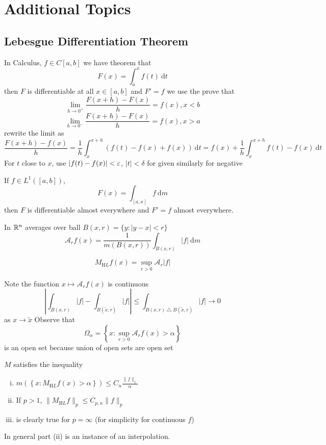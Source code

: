 
\chapter{Additional Topics}
\section{Lebesgue Differentiation Theorem}

In Calculus, $f \in C[a, b]$
we have theorem that 
\[F(x) = \int_a^x f(t) \ \mathrm{d}t\]
then $F$ is differentiable at all $x \in [a, b]$ and $F' = f$
we use the prove that
\[\lim_{h \to 0^+} \frac{F(x+h) - F(x)}{h} = f(x), x < b\]
\[\lim_{h \to 0^-} \frac{F(x+h) - F(x)}{h} = f(x), x > a\]
rewrite the limit as 
\[\frac{F(x+h) - f(x)}h = \frac1h \int_x^{x+h} (f(t) - f(x) + f(x)) \ \mathrm{d}t = f(x) + \frac1h\int_x^{x+h}f(t) - f(x) \ \mathrm{d}t\]
For $t$ close to $x$, use $|f(t) - f(x)| < \varepsilon$, $|t| < \delta$ for given
similarly for negative

\begin{theorem}
  If $f \in L^1([a, b])$,
  \[F(x) = \int_{[a, x]} f \ \mathrm{d}m\]
  then $F$ is differentiable almost everywhere and $F' = f$ almost everywhere.
\end{theorem}
\begin{definition}
  In $\mathbb R^n$ averages over ball $B(x, r) = \{y : |y-x| < r\}$
  \[\mathcal{A}_r f(x) = \frac{1}{m(B(x, r))} \int_{B(x, r)} |f| \ \mathrm{d}m\]
\end{definition}
\begin{definition}
  \[M_{\mathrm HL}f(x) = \sup_{r > 0} \mathcal{A}_r |f|\] 
\end{definition}

\begin{remark}
  Note the function
  $x \mapsto \mathcal{A}_r f(x)$ is continuous
  \[\left|\int_{B(x, r)} |f| - \int_{B(\widetilde{x}, r)} |f| \right| \le \int_{B(x, r) \bigtriangleup B(\widetilde{x}, r)} |f| \to 0\]
  as $x \to \widetilde{x}$
  Observe that
  \[\Omega_\alpha = \left\{x : \sup_{r > 0} \mathcal{A}_r f(x) > \alpha\right\}\]
  is an open set because union of open sets are open set
\end{remark}

\begin{theorem}
  $M$ satisfies the inequality
  \begin{enumerate}[(i)]
    \item $m\left(\left\{x : M_{\mathrm HL}f(x) > \alpha\right\}\right) \le C_n \frac{\|f\|_1}{\alpha}$
    \item If $p > 1$, $\|M_{\mathrm HL}f\|_p \le C_{p, n} \|f\|_p$
    \item is clearly true for $p = \infty$ (for simplicity for continuous $f$)
  \end{enumerate}
  In general part (ii) is an instance of an interpolation.
\end{theorem}

